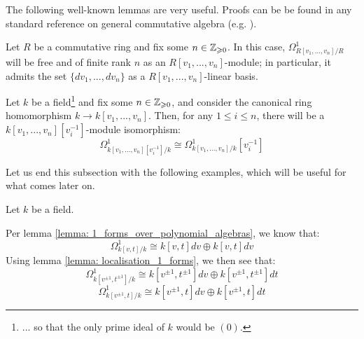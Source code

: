         The following well-known lemmas are very useful. Proofs can be be found in any standard reference on general commutative algebra (e.g. \cite[\href{https://stacks.math.columbia.edu/tag/00AO}{Tag 00AO}]{stacks}).
        \begin{lemma} \label{lemma: 1_forms_over_polynomial_algebras}
            \cite[\href{https://stacks.math.columbia.edu/tag/00RX}{Tag 00RX}]{stacks} Let $R$ be a commutative ring and fix some $n \in \mathbb{Z}_{\geqslant 0}$. In this case, $\Omega^1_{R[v_1, ..., v_n]/R}$ will be free and of finite rank $n$ as an $R[v_1, ..., v_n]$-module; in particular, it admits the set $\{dv_1, ..., dv_n\}$ as a $R[v_1, ..., v_n]$-linear basis.
        \end{lemma}
        \begin{lemma} \label{lemma: localisation_1_forms}
            \cite[\href{https://stacks.math.columbia.edu/tag/031G}{Tag 031G}]{stacks} Let $k$ be a field\footnote{... so that the only prime ideal of $k$ would be $(0)$.} and fix some $n \in \mathbb{Z}_{\geqslant 0}$, and consider the canonical ring homomorphism $k \to k[v_1, ..., v_n]$. Then, for any $1 \leq i \leq n$, there will be a $k[v_1, ..., v_n][v_i^{-1}]$-module isomorphism:
                $$\Omega^1_{k[v_1, ..., v_n][v_i^{-1}]/k} \cong \Omega^1_{k[v_1, ..., v_n]/k}[v_i^{-1}]$$
        \end{lemma}

        Let us end this subsection with the following examples, which will be useful for what comes later on.
        \begin{example}
            Let $k$ be a field.
        
            Per lemma \ref{lemma: 1_forms_over_polynomial_algebras}, we know that:
                $$\Omega^1_{k[v, t]/k} \cong k[v, t] dv \oplus k[v, t] dv$$
            Using lemma \ref{lemma: localisation_1_forms}, we then see that:
                $$\Omega^1_{k[v^{\pm 1}, t^{\pm 1}]/k} \cong k[v^{\pm 1}, t^{\pm 1}] dv \oplus k[v^{\pm 1}, t^{\pm 1}] dt$$
                $$\Omega^1_{k[v^{\pm 1}, t]/k} \cong k[v^{\pm 1}, t] dv \oplus k[v^{\pm 1}, t] dt$$
        \end{example}

